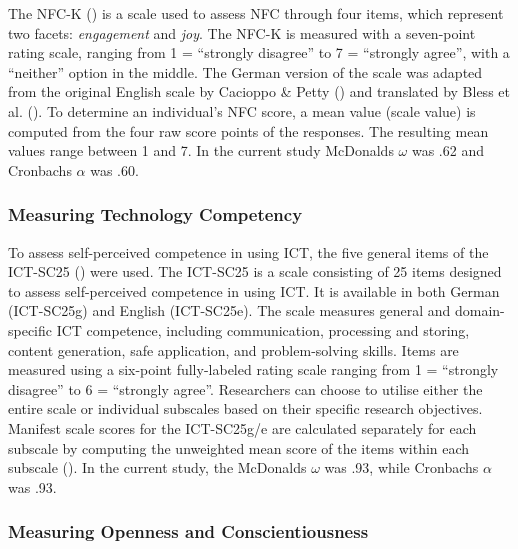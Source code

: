 \documentclass[
  12pt,
  a4paper,
  twoside]{article}
\begin{document}
The NFC-K () is a scale used to assess NFC through four items, which represent two facets: \emph{engagement} and \emph{joy}.
The NFC-K is measured with a seven-point rating scale, ranging from 1 = ``strongly disagree'' to 7 = ``strongly agree'', with a ``neither'' option in the middle.
The German version of the scale was adapted from the original English scale by Cacioppo \& Petty () and translated by Bless et al. (). To determine an individual's NFC score, a mean value (scale value) is computed from the four raw score points of the responses.
The resulting mean values range between 1 and 7.
In the current study McDonalds \(\omega\) was .62 and Cronbachs \(\alpha\) was .60.

\subsubsection{Measuring Technology Competency}\label{measuring-technology-competency}

To assess self-perceived competence in using ICT, the five general items of the ICT-SC25 () were used.
The ICT-SC25 is a scale consisting of 25 items designed to assess self-perceived competence in using ICT.
It is available in both German (ICT-SC25g) and English (ICT-SC25e).
The scale measures general and domain-specific ICT competence, including communication, processing and storing, content generation, safe application, and problem-solving skills.
Items are measured using a six-point fully-labeled rating scale ranging from 1 = ``strongly disagree'' to 6 = ``strongly agree''.
Researchers can choose to utilise either the entire scale or individual subscales based on their specific research objectives.
Manifest scale scores for the ICT-SC25g/e are calculated separately for each subscale by computing the unweighted mean score of the items within each subscale ().
In the current study, the McDonalds \(\omega\) was .93, while Cronbachs \(\alpha\) was .93.

\subsubsection{Measuring Openness and Conscientiousness}\label{measuring-openness-and-conscientiousness}
\end{document}
